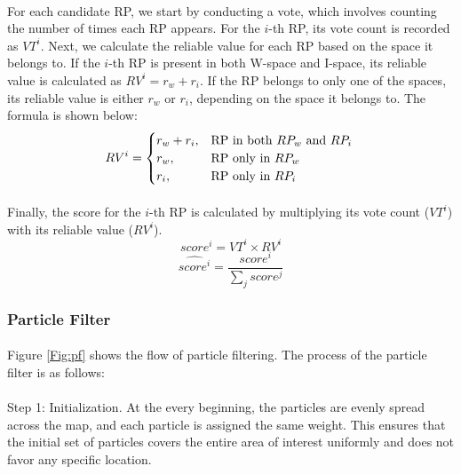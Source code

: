 \documentclass[a4paper,12pt]{report}
\begin{document}
\paragraph{}
For each candidate RP, we start by conducting a vote, which involves counting the number of times each RP appears. For the $i$-th RP, its vote count is recorded as $VT^i$. Next, we calculate the reliable value for each RP based on the space it belongs to. If the $i$-th RP is present in both W-space and I-space, its reliable value is calculated as $RV^i=r_w+r_i$. If the RP belongs to only one of the spaces, its reliable value is either $r_w$ or $r_i$, depending on the space it belongs to. The formula is shown below:
\begin{equation}
    \label{Eq:RP_RV}
    RV^i=\begin{cases}
        r_w+r_i, &\text{RP in both $RP_w$ and $RP_i$}\\
        r_w, &\text{RP only in $RP_w$}\\
        r_i, &\text{RP only in $RP_i$}
    \end{cases} \\  
\end{equation}
\paragraph{}
Finally, the score for the $i$-th RP is calculated by multiplying its vote count ($VT^i$) with its reliable value ($RV^i$).
\begin{equation}
    \label{Eq:RP_score}
    score^i=VT^i\times RV^i
\end{equation}
\begin{equation}
    \label{Eq:RP_score_normalize}
    \hat{score^i}=\frac{score^i}{\sum_j{score^j}}
\end{equation}

\subsubsection{Particle Filter}
\paragraph{}
Figure \ref{Fig:pf} shows the flow of particle filtering. The process of the particle filter is as follows:
\paragraph{}
Step 1: Initialization. At the every beginning, the particles are evenly spread across the map, and each particle is assigned the same weight. This ensures that the initial set of particles covers the entire area of interest uniformly and does not favor any specific location.
\end{document}
